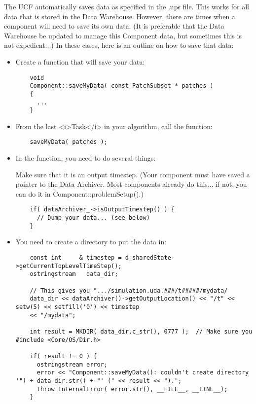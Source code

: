 \documentclass[11pt,fleqn]{book} %
\begin{document}
The UCF automatically saves data as specified in the .ups file.  This
works for all data that is stored in the Data Warehouse.  However,
there are times when a component will need to save its own data.  (It
is preferable that the Data Warehouse be updated to manage this
Component data, but sometimes this is not expedient...)  In these
cases, here is an outline on how to save that data:

\begin{itemize}
\item Create a function that will save your data:

  \begin{lstlisting}
    void
    Component::saveMyData( const PatchSubset * patches )
    {
      ...
    }
  \end{lstlisting}

\item From the last <i>Task</i> in your algorithm, call the function:

  \begin{lstlisting}
    saveMyData( patches );
  \end{lstlisting}

\item In the function, you need to do several things:

  Make sure that it is an output timestep.  (Your component must have
  saved a pointer to the Data Archiver.  Most components already do
  this... if not, you can do it in Component::problemSetup().)

  \begin{lstlisting}
    if( dataArchiver_->isOutputTimestep() ) {
      // Dump your data... (see below)
    }
  \end{lstlisting}

\item You need to create a directory to put the data in:

  \begin{lstlisting}
    const int     & timestep = d_sharedState->getCurrentTopLevelTimeStep();
    ostringstream   data_dir;

    // This gives you ".../simulation.uda.###/t#####/mydata/
    data_dir << dataArchiver()->getOutputLocation() << "/t" << setw(5) << setfill('0') << timestep
    << "/mydata";
    
    int result = MKDIR( data_dir.c_str(), 0777 );  // Make sure you #include <Core/OS/Dir.h>

    if( result != 0 ) {
      ostringstream error;
      error << "Component::saveMyData(): couldn't create directory '") + data_dir.str() + "' (" << result << ").";
      throw InternalError( error.str(), __FILE__, __LINE__);        
    }
  \end{lstlisting}


\end{itemize}
\end{document}
